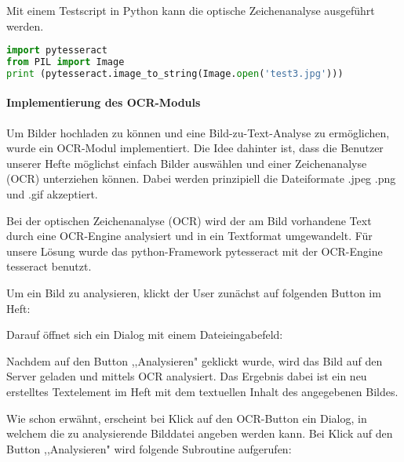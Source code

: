 Mit einem Testscript in Python kann die optische Zeichenanalyse ausgeführt werden.

\begin{lstlisting}[caption={pytesseract-Code}, language=Python]
import pytesseract
from PIL import Image
print (pytesseract.image_to_string(Image.open('test3.jpg')))
\end{lstlisting}

\paragraph{Implementierung des OCR-Moduls}
Um Bilder hochladen zu können und eine Bild-zu-Text-Analyse zu ermöglichen, wurde ein OCR-Modul implementiert. Die Idee dahinter ist, dass die Benutzer unserer Hefte möglichst einfach Bilder auswählen und einer Zeichenanalyse (OCR) unterziehen können. Dabei werden prinzipiell die Dateiformate .jpeg .png und .gif akzeptiert.

Bei der optischen Zeichenanalyse (OCR) wird der am Bild vorhandene Text durch eine OCR-Engine analysiert und in ein Textformat umgewandelt. Für unsere Lösung wurde das python-Framework pytesseract mit der OCR-Engine tesseract benutzt.

Um ein Bild zu analysieren, klickt der User zunächst auf folgenden Button im Heft:


Darauf öffnet sich ein Dialog mit einem Dateieingabefeld:


Nachdem auf den Button ,,Analysieren" geklickt wurde, wird das Bild auf den Server geladen und mittels OCR analysiert. Das Ergebnis dabei ist ein neu erstelltes Textelement im Heft mit dem textuellen Inhalt des angegebenen Bildes.

Wie schon erwähnt, erscheint bei Klick auf den OCR-Button ein Dialog, in welchem die zu analysierende Bilddatei angeben werden kann. Bei Klick auf den Button ,,Analysieren" wird folgende Subroutine aufgerufen:

